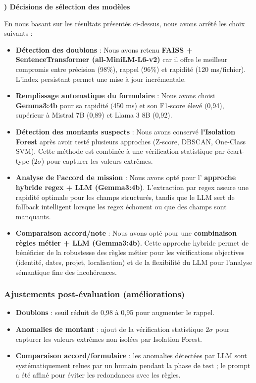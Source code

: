 \documentclass[12pt,a4paper]{report}
\newcounter{subsubsubcounter}[subsubsection]
\renewcommand{\thesubsubsubcounter}{\alph{subsubsubcounter}}
\newcommand{\subsubsubsection}[1]{%
  \stepcounter{subsubsubcounter}%
  \vspace{0.2\baselineskip}%
  \noindent
  \hspace*{8em}\textbf{\thesubsubsubcounter) #1}%
  \par
  \vspace{0.1\baselineskip}%
}
\begin{document}
\subsubsubsection{Décisions de sélection des modèles}

En nous basant sur les résultats présentés ci-dessus, nous avons arrêté les choix suivants :

\begin{itemize}
\item \textbf{Détection des doublons} : Nous avons retenu \textbf{FAISS + SentenceTransformer (all-MiniLM-L6-v2)} car il offre le meilleur compromis entre précision (98\%), rappel (96\%) et rapidité (120 ms/fichier). L'index persistant permet une mise à jour incrémentale.

\item \textbf{Remplissage automatique du formulaire} : Nous avons choisi \textbf{Gemma3:4b} pour sa rapidité (450 ms) et son F1-score élevé (0,94), supérieur à Mistral 7B (0,89) et Llama 3 8B (0,92).

\item \textbf{Détection des montants suspects} : Nous avons conservé \textbf{l'Isolation Forest} après avoir testé plusieurs approches (Z-score, DBSCAN, One-Class SVM). Cette méthode est combinée à une vérification statistique par écart-type ($2\sigma$) pour capturer les valeurs extrêmes.

\item \textbf{Analyse de l'accord de mission} : Nous avons opté pour l' \textbf{approche hybride regex + LLM (Gemma3:4b)}. L'extraction par regex assure une rapidité optimale pour les champs structurés, tandis que le LLM sert de fallback intelligent lorsque les regex échouent ou que des champs sont manquants.

\item \textbf{Comparaison accord/note} : Nous avons opté pour une \textbf{combinaison règles métier + LLM (Gemma3:4b)}. Cette approche hybride permet de bénéficier de la robustesse des règles métier pour les vérifications objectives (identité, dates, projet, localisation) et de la flexibilité du LLM pour l'analyse sémantique fine des incohérences.
\end{itemize}

\subsubsection{Ajustements post-évaluation (améliorations)}

\begin{itemize}
\item \textbf{Doublons} : seuil réduit de 0,98 à 0,95 pour augmenter le rappel.
\item \textbf{Anomalies de montant} : ajout de la vérification statistique $2\sigma$ pour capturer les valeurs extrêmes non isolées par Isolation Forest.
\item \textbf{Comparaison accord/formulaire} : les anomalies détectées par LLM sont systématiquement relues par un humain pendant la phase de test ; le prompt a été affiné pour éviter les redondances avec les règles.
\end{itemize}
\end{document}

